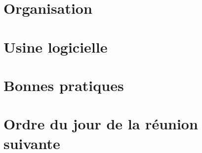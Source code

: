 \documentclass[11pt,a4paper,french,twoside,openright]{article}
\begin{document}
\section{Organisation}

\section{Usine logicielle}

\section{Bonnes pratiques}

\section{Ordre du jour de la réunion suivante}

\label{LastPage}
\end{document}
